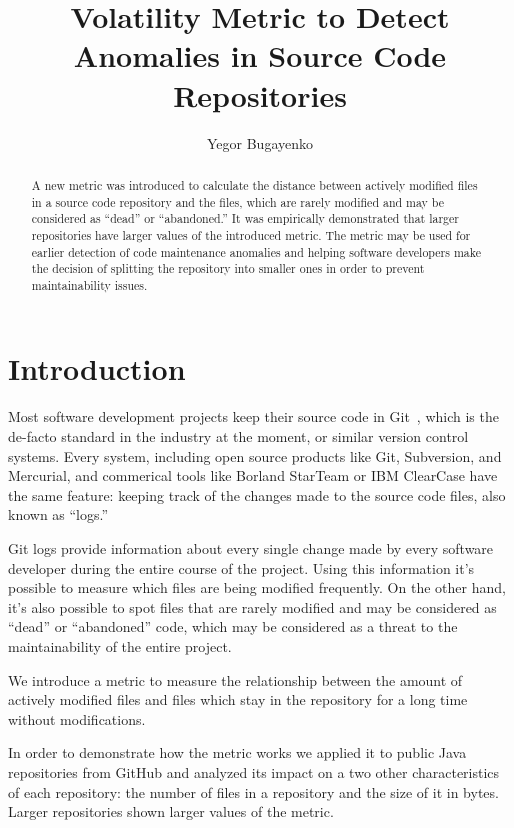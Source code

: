 \documentclass[sigconf]{acmart}
\title{Volatility Metric to Detect Anomalies in Source Code Repositories}
\author{Yegor Bugayenko}{}{}
\affiliation{%
  \institution{Huawei Technologies Co., Ltd.}
  \city{Moscow, Russia}
}
\begin{document}
\begin{abstract}
A new metric was introduced to calculate the distance
between actively modified files in a source code repository
and the files, which are rarely modified and may be considered
as ``dead'' or ``abandoned.'' It was empirically demonstrated that larger repositories
have larger values of the introduced metric.
The metric may be used for earlier detection of code maintenance anomalies
and helping software developers make the decision of splitting the repository
into smaller ones in order to prevent maintainability issues.
\end{abstract}
\maketitle

\section{Introduction}

Most software development projects keep their source code in Git~\citep{loeliger2012},
which is the de-facto standard in the industry at the moment, or similar
version control systems. Every system, including open
source products like Git, Subversion, and Mercurial, and commerical tools
like Borland StarTeam\texttrademark{} or IBM ClearCase\texttrademark{}
have the same feature: keeping track of the changes
made to the source code files, also known as ``logs.''

Git logs provide information about every single change made by every software
developer during the entire course of the project. Using this information
it's possible to measure which files are being modified frequently. On the
other hand, it's also possible to spot files that are rarely modified and may
be considered as ``dead'' or ``abandoned'' code, which may be considered as a threat
to the maintainability of the entire project.

We introduce a metric to measure the relationship
between the amount of actively modified files and files which stay
in the repository for a long time without modifications.

In order to demonstrate how the metric works we applied it to
\thetotalrepos{} public Java repositories from GitHub and analyzed
its impact on a two other characteristics of each repository:
the number of files in a repository and the size of it in bytes.
Larger repositories shown larger values of the metric.
\end{document}
